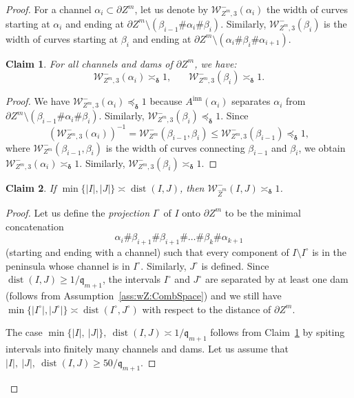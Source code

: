 \documentclass{amsart}
\renewcommand{\sp}{{\ \ }}
\newcommand{\1}{{\mathbb 1 }}
\newcommand{\Width}{{\mathcal W}}
\newcommand{\wZ}{{\widehat Z}}
\newcommand{\qq}{\mathfrak{q}}
\newcommand\inn{{\operatorname{inn}}}
\newtheorem{claim7}{Claim}
\theoremstyle{remark}
\numberwithin{equation}{section}
\theoremstyle{definition}
\newcommand{\dist}{\operatorname{dist}}
\newcommand{\bdelta}{{\boldsymbol{ \delta}}}
\begin{document}
\begin{proof} For a channel $\alpha_i\subset \partial Z^m$, let us denote by $\Width^-_{Z^m, 3}(\alpha_i)$ the width of curves starting at $\alpha_i$ and ending at $\partial Z^m\setminus (\beta_{i-1}\# \alpha_i\# \beta_{i})$. Similarly, $\Width^-_{Z^m, 3}(\beta_i)$ is the width of curves starting at $\beta_i$ and ending at $\partial Z^m\setminus (\alpha_{i}\# \beta_i\# \alpha_{i+1})$.

\begin{claim7}
\label{cl7:small case} For all channels and dams of $\partial Z^m$, we have:
\[ \Width^-_{Z^m, 3}(\alpha_i)\asymp_\bdelta 1,\sp\sp\sp\sp\Width^-_{Z^m, 3}(\beta_i)\asymp_\bdelta 1 .\] 
\end{claim7}
\begin{proof}
We have $\Width^-_{Z^m, 3}(\alpha_i)\preceq_\bdelta 1$ because $A^\inn(\alpha_i)$ separates $\alpha_i$ from $\partial Z^m\setminus (\beta_{i-1}\# \alpha_i\# \beta_{i})$. Similarly, $\Width^-_{Z^m, 3}(\beta_i)\preceq_\bdelta 1$. Since 
\[\left(\Width^-_{Z^m, 3}(\alpha_i) \right)^{-1} = \Width^-_{Z^m}(\beta_{i-1},\beta_i)\le \Width^-_{Z^m,3}(\beta_{i-1})\preceq_\bdelta 1,\]
where $\Width^-_{Z^m}(\beta_{i-1},\beta_i)$ is the width of curves connecting $\beta_{i-1}$ and $\beta_i$, we obtain $\Width^-_{Z^m, 3}(\alpha_i)\asymp_\bdelta 1$. Similarly, $\Width^-_{Z^m, 3}(\beta_i)\asymp_\bdelta 1$.
\end{proof}


\begin{claim7}
\label{cl7:base case}
If $\min\{|I|,|J|\}\asymp \dist(I,J)$, then $\Width^-_{\wZ^m}(I,J)\asymp_\bdelta 1$.
\end{claim7}
\begin{proof}  Let us define the \emph{projection} $I^\circ$ of $I$ onto $\partial Z^m$ to be the minimal concatenation 
\[\alpha_i\#\beta_{i+1}\#\beta_{i+1}\#\dots \#\beta_k\#\alpha_{k+1}\]
(starting and ending with a channel) such that every component of $I\setminus I^\circ$ is in the peninsula whose channel is in $I^\circ$. Similarly, $J^\circ $ is defined. Since $\dist(I,J)\ge 1/\qq_{m+1}$, the intervals $I^\circ$ and $J^\circ$ are separated by at least one dam (follows from Assumption~\ref{ass:wZ:CombSpace}) and we still have $\min\{|I^\circ|, |J^\circ|\} \asymp \dist(I^\circ ,J^\circ)$ with respect to the distance of $\partial Z^m$.  

The case $\min\{|I|,\ |J|\},\ \dist(I,J) \asymp 1/\qq_{m+1}$ follows from Claim~\ref{cl7:small case} by spiting intervals into finitely many channels and dams. Let us assume that $|I|,\ |J|,\ \dist(I,J) \ge 50/\qq_{m+1}$.    


\end{proof}
\end{proof}
\end{document}
